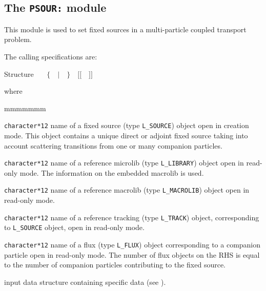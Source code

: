 \subsection{The {\tt PSOUR:} module}\label{sect:PSOURData}

This module is used to set fixed sources in a multi-particle coupled transport problem.

\vskip 0.02cm

The calling specifications are:

\begin{DataStructure}{Structure }
~\moc{:=}~~$\{$~~$|$~~$\}$~~$[[$~~$]]$~\moc{::}~ \\
\end{DataStructure}

\noindent where
\begin{ListeDeDescription}{mmmmmmm}

\item[\dusa{SOURCE}] {\tt character*12} name of a {\sc fixed source} (type {\tt L\_SOURCE}) object open in creation
mode. This object contains a unique direct or adjoint fixed source taking into account scattering transitions from one or many companion particles.

\item[\dusa{MICRO}] {\tt character*12} name of a reference {\sc microlib} (type {\tt L\_LIBRARY}) object open in read-only mode. The information on
the embedded macrolib is used.

\item[\dusa{MACRO}] {\tt character*12} name of a reference {\sc macrolib} (type {\tt L\_MACROLIB}) object open in read-only mode.

\item[\dusa{TRACK}] {\tt character*12} name of a reference {\sc tracking} (type {\tt L\_TRACK}) object, corresponding to {\tt L\_SOURCE} object, open in read-only mode.

\item[\dusa{FLUX}] {\tt character*12} name of a {\sc flux} (type {\tt L\_FLUX}) object corresponding to a companion particle open in read-only mode. The number of {\sc flux} objects on the RHS is equal to the number of companion particles contributing to the fixed source.

\item[\dusa{PSOUR\_data}] input data structure containing specific data (see ).

\end{ListeDeDescription}

